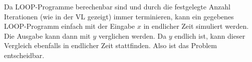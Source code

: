 Da LOOP-Programme berechenbar sind und durch die festgelegte Anzahl Iterationen
(wie in der VL gezeigt) immer terminieren, kann ein gegebenes LOOP-Programm
einfach mit der Eingabe $x$ in endlicher Zeit simuliert werden. Die Ausgabe kann
dann mit $y$ verglichen werden. Da $y$ endlich ist, kann dieser Vergleich
ebenfalls in endlicher Zeit stattfinden. Also ist das Problem entscheidbar.
